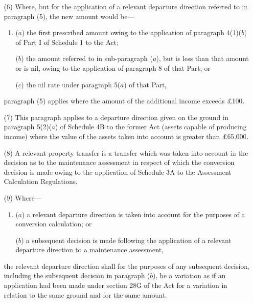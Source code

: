 \documentclass[12pt,a4paper]{article}
\begin{document}

(6) Where, but for the application of a relevant departure direction referred to in paragraph (5), the new amount would be—
\begin{enumerate}\item[]
($a$) the first prescribed amount owing to the application of paragraph 4(1)($b$)  of Part I of Schedule 1 to the Act;

($b$) the amount referred to in sub-paragraph ($a$), but is less than that amount or is nil, owing to the application of paragraph 8 of that Part; or

($c$) the nil rate under paragraph 5($a$)  of that Part,
\end{enumerate}
paragraph (5) applies where the amount of the additional income exceeds £100.

(7) This paragraph applies to a departure direction given on the ground in paragraph 5(2)($a$)  of Schedule 4B to the former Act (assets capable of producing income) where the value of the assets taken into account is greater than £65,000.

(8) A relevant property transfer is a transfer which was taken into account in the decision as to the maintenance assessment in respect of which the conversion decision is made owing to the application of Schedule 3A to the Assessment Calculation Regulations.

(9) Where—
\begin{enumerate}\item[]
($a$) a relevant departure direction is taken into account for the purposes of a conversion calculation; or

($b$) a subsequent decision is made following the application of a relevant departure direction to a maintenance assessment,
\end{enumerate}
the relevant departure direction shall for the purposes of any subsequent decision, including the subsequent decision in paragraph ($b$), be a variation as if an application had been made under section 28G of the Act for a variation in relation to the same ground and for the same amount.
\end{document}
